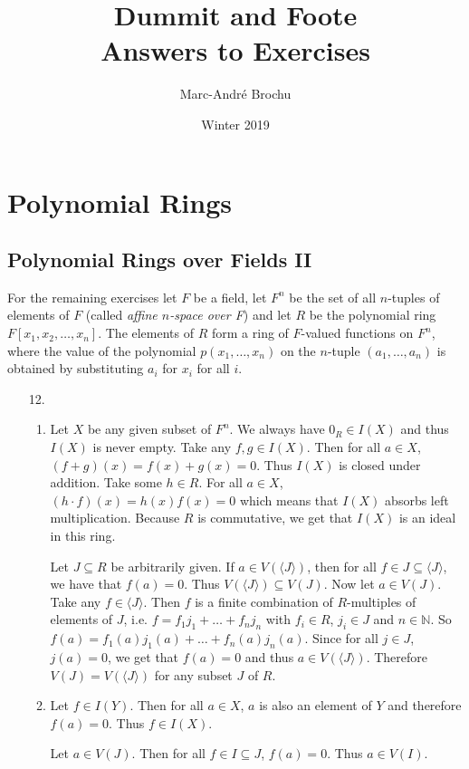 \documentclass{report}
\begin{document}
\title{Dummit and Foote\\Answers to Exercises}
\author{Marc-André Brochu}
\date{Winter 2019}
\maketitle

\setcounter{chapter}{8}

\chapter{Polynomial Rings}

\section{Polynomial Rings over Fields II}

For the remaining exercises let $F$ be a field, let $F^n$ be the set of all $n$-tuples of elements of $F$ (called \textit{affine $n$-space over F}) and let $R$ be the polynomial ring $F[x_1,x_2,\dots,x_n]$. The elements of $R$ form a ring of $F$-valued functions on $F^n$, where the value of the polynomial $p(x_1,\dots,x_n)$ on the $n$-tuple $(a_1,\dots,a_n)$ is obtained by substituting $a_i$ for $x_i$ for all $i$.

\begin{enumerate}
\item[12.]
\begin{enumerate}
\item
Let $X$ be any given subset of $F^n$. We always have $0_R\in I(X)$ and thus $I(X)$ is never empty. Take any $f,g\in I(X)$. Then for all $a\in X$, $(f+g)(x) = f(x)+g(x)=0$. Thus $I(X)$ is closed under addition. Take some $h\in R$. For all $a\in X$, $(h\cdot f)(x)=h(x)f(x)=0$ which means that $I(X)$ absorbs left multiplication. Because $R$ is commutative, we get that $I(X)$ is an ideal in this ring.

Let $J\subseteq R$ be arbitrarily given. If $a\in V(\langle J\rangle)$, then for all $f\in J\subseteq \langle J\rangle$, we have that $f(a)=0$. Thus $V(\langle J\rangle)\subseteq V(J)$. Now let $a\in V(J)$. Take any $f\in \langle J\rangle$. Then $f$ is a finite combination of $R$-multiples of elements of $J$, i.e. $f=f_1j_1+\dots+f_nj_n$ with $f_i\in R$, $j_i\in J$ and $n\in \mathbb{N}$. So $f(a) = f_1(a)j_1(a)+\dots+f_n(a)j_n(a)$. Since for all $j\in J$, $j(a)=0$, we get that $f(a)=0$ and thus $a\in V(\langle J\rangle)$. Therefore $V(J)=V(\langle J\rangle)$ for any subset $J$ of $R$.

\item
Let $f\in I(Y)$. Then for all $a\in X$, $a$ is also an element of $Y$ and therefore $f(a)=0$. Thus $f\in I(X)$.

Let $a\in V(J)$. Then for all $f\in I\subseteq J$, $f(a)=0$. Thus $a\in V(I)$.
\end{enumerate}
\end{enumerate}
\end{document}
